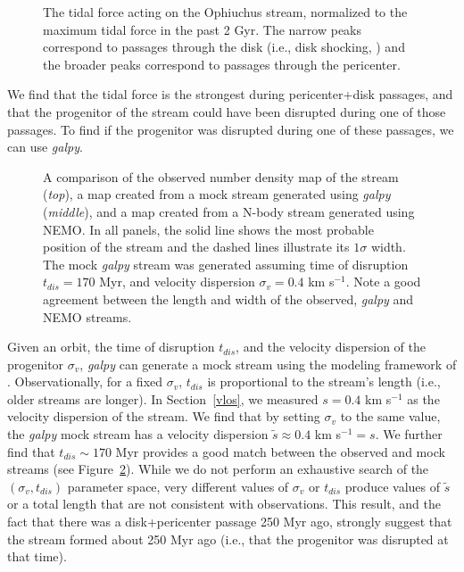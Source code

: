 \documentclass[iop]{emulateapj}
\begin{document}
\begin{figure}
\caption{
The tidal force acting on the Ophiuchus stream, normalized to the maximum tidal
force in the past 2 Gyr. The narrow peaks correspond to passages through the
disk (i.e., disk shocking, \citealt{osc72}) and the broader peaks correspond to
passages through the pericenter.
\label{tidal_force}}
\end{figure}

We find that the tidal force is the strongest during pericenter+disk passages,
and that the progenitor of the stream could have been disrupted during one of
those passages. To find if the progenitor was disrupted during one of these
passages, we can use {\em galpy}.

\begin{figure}


\caption{
A comparison of the observed number density map of the stream ({\em top}), a map
created from a mock stream generated using {\em galpy} ({\em middle}), and a map
created from a N-body stream generated using NEMO. In all panels, the solid line
shows the most probable position of the stream and the dashed lines illustrate
its $1\sigma$ width. The mock {\em galpy} stream was generated assuming time of
disruption $t_{dis}=170$ Myr, and velocity dispersion $\sigma_{v}=0.4$ km
s$^{-1}$. Note a good agreement between the length and width of the observed,
{\em galpy} and NEMO streams.
\label{observed_vs_mock_comparison}}
\end{figure}

Given an orbit, the time of disruption $t_{dis}$, and the velocity dispersion of
the progenitor $\sigma_v$, {\em galpy} can generate a mock stream using the modeling
framework of \citet{bov14}. Observationally, for a fixed $\sigma_v$, $t_{dis}$
is proportional to the stream's length (i.e., older streams are longer). In
Section~\ref{vlos}, we measured $s=0.4$ km s$^{-1}$ as the velocity dispersion
of the stream. We find that by setting $\sigma_v$ to the same value, the {\em galpy} mock stream has a velocity dispersion $\tilde{s} \approx 0.4$ km s$^{-1} = s$. We further find that $t_{dis}\sim170$
Myr provides a good match between the observed and mock streams (see
Figure~\ref{observed_vs_mock_comparison}). While we do not perform an exhaustive search of the $(\sigma_v,t_{dis})$ parameter space, very different values of $\sigma_v$ or $t_{dis}$ produce values of $\tilde{s}$ or a total length that are not consistent
with observations. This result, and the fact that there was a disk+pericenter
passage 250 Myr ago, strongly suggest that the stream formed about 250 Myr ago
(i.e., that the progenitor was disrupted at that time).
\end{document}
